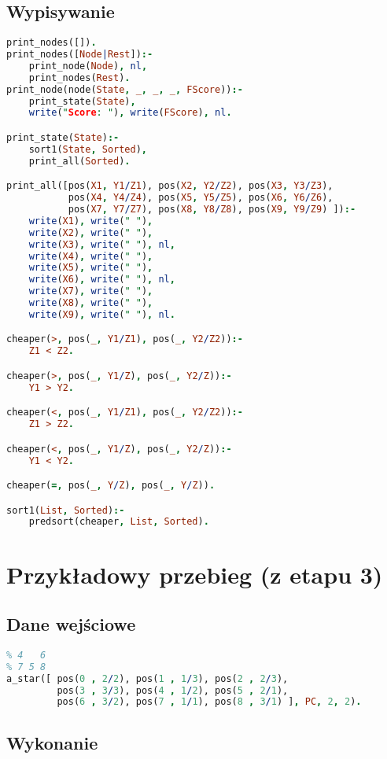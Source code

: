 \documentclass[11pt,a4paper]{article}
\begin{document}
\subsection{Wypisywanie}\label{sec:print}
\begin{lstlisting}[language=Prolog]
print_nodes([]).
print_nodes([Node|Rest]):-
    print_node(Node), nl,
    print_nodes(Rest).  
print_node(node(State, _, _, _, FScore)):-
    print_state(State),
    write("Score: "), write(FScore), nl.

print_state(State):-
    sort1(State, Sorted),
    print_all(Sorted).

print_all([pos(X1, Y1/Z1), pos(X2, Y2/Z2), pos(X3, Y3/Z3),
           pos(X4, Y4/Z4), pos(X5, Y5/Z5), pos(X6, Y6/Z6),
           pos(X7, Y7/Z7), pos(X8, Y8/Z8), pos(X9, Y9/Z9) ]):-
    write(X1), write(" "),
    write(X2), write(" "),
    write(X3), write(" "), nl,
    write(X4), write(" "),
    write(X5), write(" "),
    write(X6), write(" "), nl,
    write(X7), write(" "),
    write(X8), write(" "),
    write(X9), write(" "), nl.

cheaper(>, pos(_, Y1/Z1), pos(_, Y2/Z2)):-
    Z1 < Z2.

cheaper(>, pos(_, Y1/Z), pos(_, Y2/Z)):-
    Y1 > Y2.

cheaper(<, pos(_, Y1/Z1), pos(_, Y2/Z2)):-
    Z1 > Z2.

cheaper(<, pos(_, Y1/Z), pos(_, Y2/Z)):-
    Y1 < Y2.

cheaper(=, pos(_, Y/Z), pos(_, Y/Z)).

sort1(List, Sorted):-
    predsort(cheaper, List, Sorted).
\end{lstlisting}

\section{Przykładowy przebieg (z etapu 3)}\label{sec:general}
\subsection{Dane wejściowe}\label{sec:input}
\begin{lstlisting}[language=Prolog]
% 1 2 3
% 4   6
% 7 5 8
a_star([ pos(0 , 2/2), pos(1 , 1/3), pos(2 , 2/3),
         pos(3 , 3/3), pos(4 , 1/2), pos(5 , 2/1),
         pos(6 , 3/2), pos(7 , 1/1), pos(8 , 3/1) ], PC, 2, 2).
\end{lstlisting}
\subsection{Wykonanie}\label{sec:exec}
\end{document}
